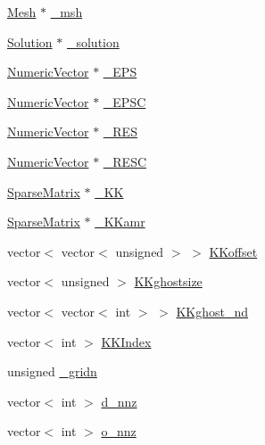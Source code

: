 \begin{DoxyCompactItemize}
\item 
\mbox{\hyperlink{classfemus_1_1_mesh}{Mesh}} $\ast$ \mbox{\hyperlink{classfemus_1_1_linear_equation_a92a4b956844e64301eb0171393e14db4}{\+\_\+msh}}
\item 
\mbox{\hyperlink{classfemus_1_1_solution}{Solution}} $\ast$ \mbox{\hyperlink{classfemus_1_1_linear_equation_a453ddac90679e3447fa774a52e3d2214}{\+\_\+solution}}
\item 
\mbox{\hyperlink{classfemus_1_1_numeric_vector}{Numeric\+Vector}} $\ast$ \mbox{\hyperlink{classfemus_1_1_linear_equation_a7f79930715e7e6c8b0ec81ee506a4ef0}{\+\_\+\+E\+PS}}
\item 
\mbox{\hyperlink{classfemus_1_1_numeric_vector}{Numeric\+Vector}} $\ast$ \mbox{\hyperlink{classfemus_1_1_linear_equation_a5248622081d9f5559ae84074d6fb4f30}{\+\_\+\+E\+P\+SC}}
\item 
\mbox{\hyperlink{classfemus_1_1_numeric_vector}{Numeric\+Vector}} $\ast$ \mbox{\hyperlink{classfemus_1_1_linear_equation_a20ac8999e714492516cd8a2be53fb54f}{\+\_\+\+R\+ES}}
\item 
\mbox{\hyperlink{classfemus_1_1_numeric_vector}{Numeric\+Vector}} $\ast$ \mbox{\hyperlink{classfemus_1_1_linear_equation_a22675b9d542dc58b67f4d2cba10a4c0d}{\+\_\+\+R\+E\+SC}}
\item 
\mbox{\hyperlink{classfemus_1_1_sparse_matrix}{Sparse\+Matrix}} $\ast$ \mbox{\hyperlink{classfemus_1_1_linear_equation_aa10eb0eb318cf0d449f5ecdcec2823bc}{\+\_\+\+KK}}
\item 
\mbox{\hyperlink{classfemus_1_1_sparse_matrix}{Sparse\+Matrix}} $\ast$ \mbox{\hyperlink{classfemus_1_1_linear_equation_ab824eb4b9859c3dff871f537d702d987}{\+\_\+\+K\+Kamr}}
\item 
vector$<$ vector$<$ unsigned $>$ $>$ \mbox{\hyperlink{classfemus_1_1_linear_equation_a9cc33138c3b62897f2e249c4e4277382}{K\+Koffset}}
\item 
vector$<$ unsigned $>$ \mbox{\hyperlink{classfemus_1_1_linear_equation_a6db7e3f4d0a8d394f024de6df33f3428}{K\+Kghostsize}}
\item 
vector$<$ vector$<$ int $>$ $>$ \mbox{\hyperlink{classfemus_1_1_linear_equation_a32e8e83ff15133ae41c1b0cc8865f4a1}{K\+Kghost\+\_\+nd}}
\item 
vector$<$ int $>$ \mbox{\hyperlink{classfemus_1_1_linear_equation_ad68dfdc247d0e64ea7b86e11755fcb3f}{K\+K\+Index}}
\item 
unsigned \mbox{\hyperlink{classfemus_1_1_linear_equation_a9e44f8c783de0cfd5dae745305882f21}{\+\_\+gridn}}
\item 
vector$<$ int $>$ \mbox{\hyperlink{classfemus_1_1_linear_equation_a54bb8d41b717a85752342c81c05fa7d0}{d\+\_\+nnz}}
\item 
vector$<$ int $>$ \mbox{\hyperlink{classfemus_1_1_linear_equation_af89df9c8bd0aa927ea92227044d790ea}{o\+\_\+nnz}}
\end{DoxyCompactItemize}

